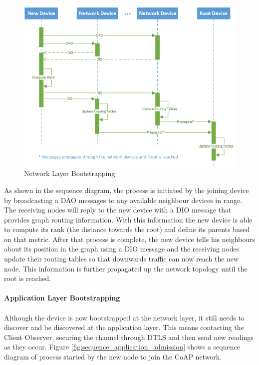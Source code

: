 \begin{figure}[h]
  \centering
  \includegraphics[width=0.8\linewidth]{figures/Sequence_Network_Admission.png}
  \caption{Network Layer Bootstrapping}
  \label{fig:sequence_network_admission}
\end{figure}

As shown in the sequence diagram, the process is initiated by the joining device by broadcasting a \ac{DAO} messages to any available neighbour devices in range. The receiving nodes will reply to the new device with a \ac{DIO} message that provides graph routing information. With this information the new device is able to compute its rank (the distance towards the root) and define its parents based on that metric. After that process is complete, the new device tells his neighbours about its position in the graph using a \ac{DIO} message and the receiving nodes update their routing tables so that downwards traffic can now reach the new node. This information is further propagated up the network topology until the root is reached.

\paragraph{\textbf{Application Layer Bootstrapping}}
\paragraph{}

Although the device is now bootstrapped at the network layer, it still needs to discover and be discovered at the application layer. This means contacting the Client Observer, securing the channel through \ac{DTLS} and then send new readings as they occur. Figure \ref{fig:sequence_application_admission} shows a sequence diagram of process started by the new node to join the \ac{CoAP} network.

